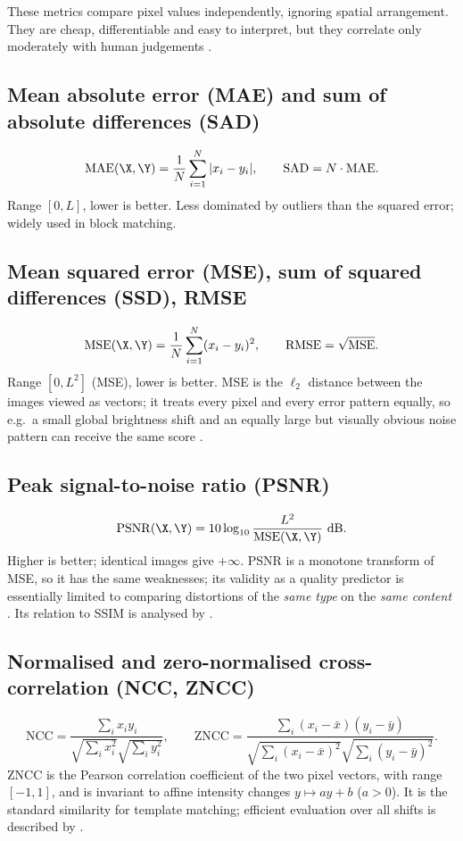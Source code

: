 These metrics compare pixel values independently, ignoring spatial arrangement. They are cheap, differentiable and easy to interpret, but they correlate only moderately with human judgements \citep{girod1993,wang2009mse}.

\subsection{Mean absolute error (MAE) and sum of absolute differences (SAD)}
\[
\mathrm{MAE}(\X,\Y) = \frac1N\sum_{i=1}^{N}|x_i-y_i|, \qquad \mathrm{SAD}=N\cdot\mathrm{MAE}.
\]
Range $[0,L]$, lower is better. Less dominated by outliers than the squared error; widely used in block matching.

\subsection{Mean squared error (MSE), sum of squared differences (SSD), RMSE}
\[
\mathrm{MSE}(\X,\Y) = \frac1N\sum_{i=1}^{N}(x_i-y_i)^2, \qquad \mathrm{RMSE}=\sqrt{\mathrm{MSE}}.
\]
Range $[0,L^2]$ (MSE), lower is better. MSE is the $\ell_2$ distance between the images viewed as vectors; it treats every pixel and every error pattern equally, so e.g.\ a small global brightness shift and an equally large but visually obvious noise pattern can receive the same score \citep{wang2009mse}.

\subsection{Peak signal-to-noise ratio (PSNR)}
\[
\mathrm{PSNR}(\X,\Y) = 10\log_{10}\frac{L^2}{\mathrm{MSE}(\X,\Y)}\ \text{dB}.
\]
Higher is better; identical images give $+\infty$. PSNR is a monotone transform of MSE, so it has the same weaknesses; its validity as a quality predictor is essentially limited to comparing distortions of the \emph{same type} on the \emph{same content} \citep{huynh2008}. Its relation to SSIM is analysed by \citet{hore2010}.

\subsection{Normalised and zero-normalised cross-correlation (NCC, ZNCC)}
\[
\mathrm{NCC}=\frac{\sum_i x_i y_i}{\sqrt{\sum_i x_i^2}\sqrt{\sum_i y_i^2}},\qquad
\mathrm{ZNCC}=\frac{\sum_i (x_i-\bar x)(y_i-\bar y)}{\sqrt{\sum_i (x_i-\bar x)^2}\sqrt{\sum_i (y_i-\bar y)^2}}.
\]
ZNCC is the Pearson correlation coefficient of the two pixel vectors, with range $[-1,1]$, and is invariant to affine intensity changes $y\mapsto ay+b$ ($a>0$). It is the standard similarity for template matching; efficient evaluation over all shifts is described by \citet{lewis1995}.

